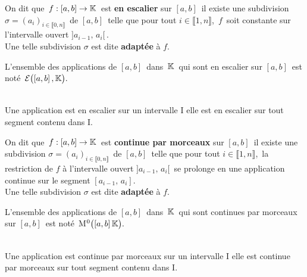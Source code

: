 \vspace{1.2cm}

On dit que \(\,f:[a,b]\to \mathbb{K}\,\) est \textbf{en escalier} sur $[a,b]\,$ \ssi il existe une subdivision\\
\(\sigma=(a_i)_{i\in \llbracket 0,n \rrbracket}\,\) de $[a,b]\,$ telle que pour tout \(i\in \llbracket 1,n \rrbracket\),\, $f\,$ soit constante sur l'intervalle ouvert \(]a_{i-1},\, a_i[\,\).\vspace{0.1cm}\\
Une telle subdivision $\sigma$ est dite \textbf{adaptée} à $f$.\vspace{0.1cm}\\
\begin{small}
    L'ensemble des applications de $[a,b]\,$ dans $\,\mathbb{K}\,$ qui sont en escalier sur $[a,b]\,$ est noté \(\,\mathcal{E}\bigl([a,b]\,,\mathbb{K}\bigr).\)
\end{small}\\
Une application est en escalier sur un intervalle I \ssi elle est en escalier sur tout segment contenu dans I.

\vspace{1.2cm}

On dit que \(\,f:[a,b]\to \mathbb{K}\,\) est \textbf{continue par morceaux} sur \([a,b]\,\) \ssi il existe une subdivision \(\sigma=(a_i)_{i\in \llbracket 0,n \rrbracket}\,\) de $[a,b]\,$ telle que pour tout \(i\in \llbracket 1,n \rrbracket\),\, la restriction de $f$ à l'intervalle ouvert \(]a_{i-1},\,a_i[\,\) se prolonge en une application continue sur le segment \([a_{i-1},\,a_i].\)\vspace{0.1cm}\\
Une telle subdivision $\sigma$ est dite \textbf{adaptée} à $f$.\vspace{0.1cm}\\
\begin{small}
    L'ensemble des applications de \([a,b]\,\) dans \(\,\mathbb{K}\,\) qui sont continues par morceaux sur \([a,b]\,\) est noté\, M\(^0\bigl([a,b]\,\mathbb{K}\bigr).\)
\end{small}\\
Une application est continue par morceaux sur un intervalle I \ssi elle est continue par morceaux sur tout segment contenu dans I.

\newpage

